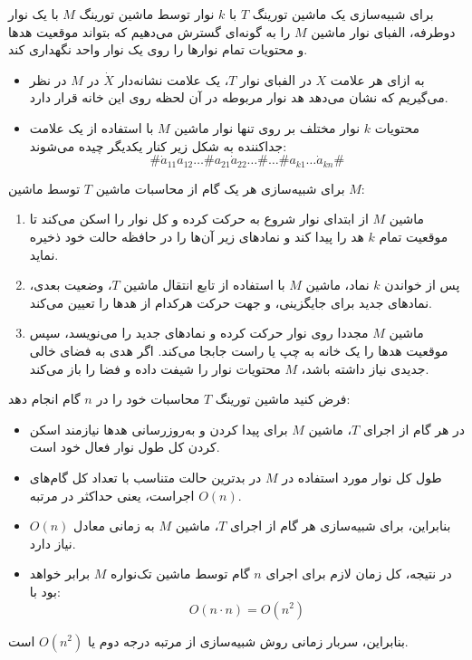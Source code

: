 برای شبیه‌سازی یک ماشین تورینگ $T$ با $k$ نوار توسط ماشین تورینگ $M$ با یک نوار دوطرفه، الفبای نوار ماشین $M$ را به گونه‌ای گسترش می‌دهیم که بتواند موقعیت هدها و محتویات تمام نوارها را روی یک نوار واحد نگهداری کند.

\begin{itemize}
    \item به ازای هر علامت $X$ در الفبای نوار $T$، یک علامت نشانه‌دار $\dot{X}$ در $M$ در نظر می‌گیریم که نشان می‌دهد هد نوار مربوطه در آن لحظه روی این خانه قرار دارد.
    \item محتویات $k$ نوار مختلف بر روی تنها نوار ماشین $M$ با استفاده از یک علامت جداکننده به شکل زیر کنار یکدیگر چیده می‌شوند:
    $$ \# \dot{a}_{11} a_{12} \dots \# a_{21} \dot{a}_{22} \dots \# \dots \# a_{k1} \dots \dot{a}_{kn} \# $$
\end{itemize}

برای شبیه‌سازی هر یک گام از محاسبات ماشین $T$ توسط ماشین $M$:
\begin{enumerate}
    \item ماشین $M$ از ابتدای نوار شروع به حرکت کرده و کل نوار را اسکن می‌کند تا موقعیت تمام $k$ هد را پیدا کند و نمادهای زیر آن‌ها را در حافظه حالت خود ذخیره نماید.
    \item پس از خواندن $k$ نماد، ماشین $M$ با استفاده از تابع انتقال ماشین $T$، وضعیت بعدی، نمادهای جدید برای جایگزینی، و جهت حرکت هرکدام از هدها را تعیین می‌کند.
    \item ماشین $M$ مجددا روی نوار حرکت کرده و نمادهای جدید را می‌نویسد، سپس موقعیت هدها را یک خانه به چپ یا راست جابجا می‌کند. اگر هدی به فضای خالی جدیدی نیاز داشته باشد، $M$ محتویات نوار را شیفت داده و فضا را باز می‌کند.
\end{enumerate}

فرض کنید ماشین تورینگ $T$ محاسبات خود را در $n$ گام انجام دهد:
\begin{itemize}
    \item در هر گام از اجرای $T$، ماشین $M$ برای پیدا کردن و به‌روزرسانی هدها نیازمند اسکن کردن کل طول نوار فعال خود است.
    \item طول کل نوار مورد استفاده در $M$ در بدترین حالت متناسب با تعداد کل گام‌های اجراست، یعنی حداکثر در مرتبه $O(n)$.
    \item بنابراین، برای شبیه‌سازی هر گام از اجرای $T$، ماشین $M$ به زمانی معادل $O(n)$ نیاز دارد.
    \item در نتیجه، کل زمان لازم برای اجرای $n$ گام توسط ماشین تک‌نواره $M$ برابر خواهد بود با:
    $$ O(n \cdot n) = O(n^2) $$
\end{itemize}
بنابراین، سربار زمانی روش شبیه‌سازی از مرتبه درجه دوم یا $O(n^2)$ است.
